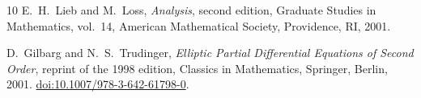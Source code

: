 \documentclass[11pt,a4paper]{article}
\theoremstyle{definition}
\theoremstyle{remark}
\begin{document}
\begin{thebibliography}{10}
E.~H.~Lieb and M.~Loss,
\emph{Analysis}, second edition, Graduate Studies in Mathematics, vol.~14,
American Mathematical Society, Providence, RI, 2001.

D.~Gilbarg and N.~S.~Trudinger,
\emph{Elliptic Partial Differential Equations of Second Order},
reprint of the 1998 edition, Classics in Mathematics, Springer, Berlin, 2001.
\href{https://doi.org/10.1007/978-3-642-61798-0}{doi:10.1007/978-3-642-61798-0}.
\end{thebibliography}
\end{document}
